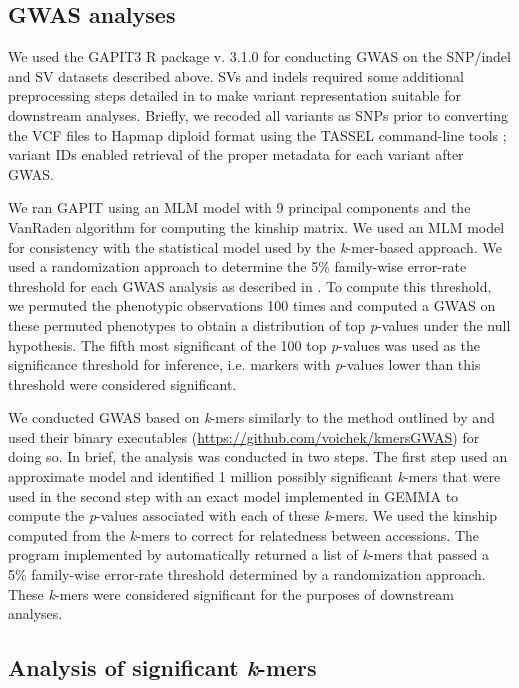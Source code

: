 \subsection*{GWAS analyses}
\label{sv-gwas-gwas-methods}

We used the GAPIT3 R package v. 3.1.0 \citep{wang2021} for conducting GWAS on
the SNP/indel and SV datasets described above. SVs and indels required some additional
preprocessing steps detailed in \cite{lemay2022gwas} to make variant
representation suitable for downstream analyses. Briefly, we recoded all
variants as SNPs prior to converting the VCF files to Hapmap diploid format
using the TASSEL command-line tools \citep{bradbury2007}; variant IDs enabled
retrieval of the proper metadata for each variant after GWAS.

We ran GAPIT using an MLM model with 9 principal components and the VanRaden
algorithm for computing the kinship matrix. We used an MLM model for
consistency with the statistical model used by the \textit{k}-mer-based
approach.  We used a randomization approach to determine the 5\% family-wise
error-rate threshold for each GWAS analysis as described in \cite{voichek2020}.
To compute this threshold, we permuted the phenotypic observations 100 times
and computed a GWAS on these permuted phenotypes to obtain a distribution of
top \emph{p}-values under the null hypothesis. The fifth most significant of
the 100 top \emph{p}-values was used as the significance threshold for
inference, i.e. markers with \emph{p}-values lower than this threshold were
considered significant.

We conducted GWAS based on \emph{k}-mers similarly to the method outlined by
\cite{voichek2020} and used their binary executables
(\url{https://github.com/voichek/kmersGWAS}) for doing so.  In brief, the
analysis was conducted in two steps. The first step used an approximate model
and identified 1 million possibly significant \emph{k}-mers that were used in
the second step with an exact model implemented in GEMMA \citep{zhou2012} to
compute the \emph{p}-values associated with each of these \emph{k}-mers. We
used the kinship computed from the \emph{k}-mers to correct for relatedness
between accessions. The program implemented by \cite{voichek2020} automatically
returned a list of \emph{k}-mers that passed a 5\% family-wise error-rate
threshold determined by a randomization approach.  These \emph{k}-mers were
considered significant for the purposes of downstream analyses.

\subsection*{Analysis of significant \emph{k}-mers}
\label{sv-gwas-kmers-analysis-methods}

